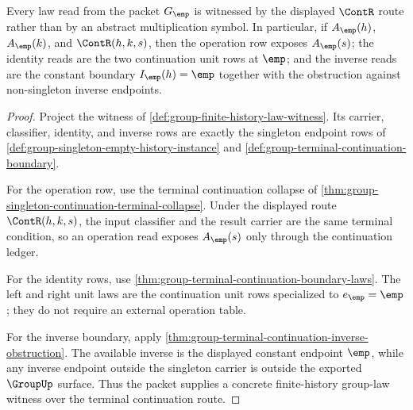 \begin{theorem}
\label{thm:group-finite-history-continuation-law-witness}
Every law read from the packet $G_{\emp}$ is witnessed by the displayed
$\ContR$ route rather than by an abstract multiplication symbol. In
particular, if $A_{\emp}(h)$, $A_{\emp}(k)$, and $\ContR(h,k,s)$, then the
operation row exposes $A_{\emp}(s)$; the identity reads are the two
continuation unit rows at $\emp$; and the inverse reads are the constant
boundary $I_{\emp}(h)=\emp$ together with the obstruction against non-singleton
inverse endpoints.
\end{theorem}
\begin{proof}
Project the witness of
\autoref{def:group-finite-history-law-witness}. Its carrier, classifier,
identity, and inverse rows are exactly the singleton endpoint rows of
\autoref{def:group-singleton-empty-history-instance} and
\autoref{def:group-terminal-continuation-boundary}.

For the operation row, use the terminal continuation collapse of
\autoref{thm:group-singleton-continuation-terminal-collapse}. Under the
displayed route $\ContR(h,k,s)$, the input classifier and the result carrier
are the same terminal condition, so an operation read exposes $A_{\emp}(s)$
only through the continuation ledger.

For the identity rows, use
\autoref{thm:group-terminal-continuation-boundary-laws}. The left and right
unit laws are the continuation unit rows specialized to $e_{\emp}=\emp$; they
do not require an external operation table.

For the inverse boundary, apply
\autoref{thm:group-terminal-continuation-inverse-obstruction}. The available
inverse is the displayed constant endpoint $\emp$, while any inverse endpoint
outside the singleton carrier is outside the exported $\GroupUp$ surface.
Thus the packet supplies a concrete finite-history group-law witness over the
terminal continuation route.
\end{proof}

